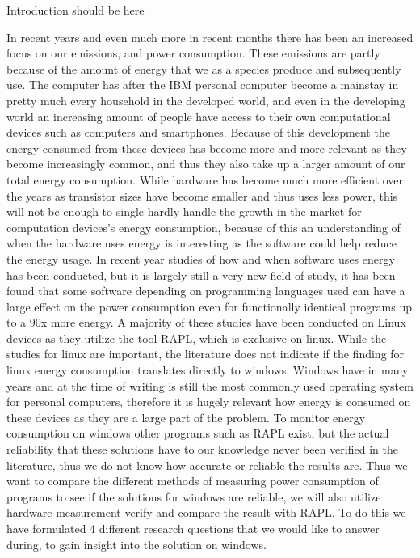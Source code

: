 
Introduction should be here

In recent years and even much more in recent months there has been an increased focus on our emissions, and power consumption. 
These emissions are partly because of the amount of energy that we as a species produce and subsequently use. 
The computer has after the IBM personal computer become a mainstay in pretty much every household in the developed world, and even in the developing world an increasing amount of people have access to their own computational devices such as computers and smartphones. 
Because of this development the energy consumed from these devices has become more and more relevant as they become increasingly common, and thus they also take up a larger amount of our total energy consumption. 
While hardware has become much more efficient over the years as transistor sizes have become smaller and thus uses less power, this will not be enough to single hardly handle the growth in the market for computation devices's energy consumption, because of this an understanding of when the hardware uses energy is interesting as the software could help reduce the energy usage. 
In recent year studies of how and when software uses energy has been conducted, but it is largely still a very new field of study, it has been found that some software depending on programming languages used can have a large effect on the power consumption even for functionally identical programs up to a 90x more energy. 
A majority of these studies have been conducted on Linux devices as they utilize the tool RAPL, which is exclusive on linux. While the studies for linux are important, the literature does not indicate if the finding for linux energy consumption translates directly to windows. 
Windows have in many years and at the time of writing is still the most commonly used operating system for personal computers, therefore it is hugely relevant how energy is consumed on these devices as they are a large part of the problem. To monitor energy consumption on windows other programs such as RAPL exist, but the actual reliability that these solutions have to our knowledge never been verified in the literature, thus we do not know how accurate or reliable the results are. 
Thus we want to compare the different methods of measuring power consumption of programs to see if the solutions for windows are reliable, we will also utilize hardware measurement verify and compare the result with RAPL. 
To do this we have formulated 4 different research questions that we would like to answer during, to gain insight into the solution on windows.
 
